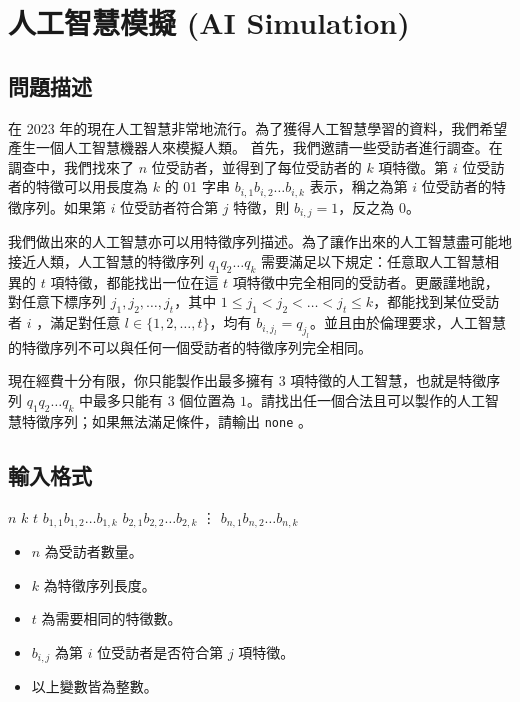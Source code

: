 \section{人工智慧模擬 (AI Simulation)}

\subsection{問題描述}

在 2023
年的現在人工智慧非常地流行。為了獲得人工智慧學習的資料，我們希望產生一個人工智慧機器人來模擬人類。
首先，我們邀請一些受訪者進行調查。在調查中，我們找來了 \(n\)
位受訪者，並得到了每位受訪者的 \(k\) 項特徵。第 \(i\)
位受訪者的特徵可以用長度為 \(k\) 的 01 字串
\(b_{i,1}b_{i,2}\ldots b_{i,k}\) 表示，稱之為第 \(i\)
位受訪者的特徵序列。如果第 \(i\) 位受訪者符合第 \(j\) 特徵，則
\(b_{i,j}=1\)，反之為 \(0\)。

我們做出來的人工智慧亦可以用特徵序列描述。為了讓作出來的人工智慧盡可能地接近人類，人工智慧的特徵序列
\(q_1q_2\ldots q_k\) 需要滿足以下規定：任意取人工智慧相異的 \(t\)
項特徵，都能找出一位在這 \(t\)
項特徵中完全相同的受訪者。更嚴謹地說，對任意下標序列
\({j_1,j_2,\ldots,j_t}\)，其中
\(1 \le j_1 < j_2 < \ldots < j_t \le k\)，都能找到某位受訪者 \(i\)
，滿足對任意 \(l\in\{1,2,\ldots,t\}\)，均有
\(b_{i,j_l}=q_{j_l}\)。並且由於倫理要求，人工智慧的特徵序列不可以與任何一個受訪者的特徵序列完全相同。

現在經費十分有限，你只能製作出最多擁有 \(3\)
項特徵的人工智慧，也就是特徵序列 \(q_1q_2\ldots q_k\) 中最多只能有 \(3\)
個位置為
\(1\)。請找出任一個合法且可以製作的人工智慧特徵序列；如果無法滿足條件，請輸出
\texttt{none} 。

\subsection{輸入格式}

\begin{format}
\f{
$n$ $k$ $t$
$b_{1,1}b_{1,2}\ldots b_{1,k}$
$b_{2,1}b_{2,2}\ldots b_{2,k}$
\vdots
$b_{n,1}b_{n,2}\ldots b_{n,k}$
}
\end{format}

\begin{itemize}
\tightlist
\item
  \(n\) 為受訪者數量。
\item
  \(k\) 為特徵序列長度。
\item
  \(t\) 為需要相同的特徵數。
\item
  \(b_{i,j}\) 為第 \(i\) 位受訪者是否符合第 \(j\) 項特徵。
\item
  以上變數皆為整數。
\end{itemize}

